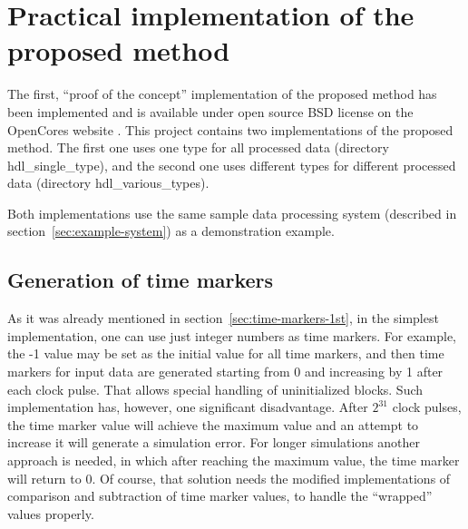 \documentclass[preprint,11pt]{elsarticle}
\newcommand{\wzcite}[1]{ \cite{#1}}
\begin{document}
\section{Practical implementation of the proposed method}
\label{sec:practical-implementation}
The first, ``proof of the concept'' implementation of the proposed method has been implemented and is available under open source BSD license on the OpenCores
website\wzcite{url-opencores-lateq}.
This project contains two implementations of the proposed method.
The first one uses one type for all processed data (directory hdl\_single\_type), and the 
second one uses different types for different processed data (directory 
hdl\_various\_types).

Both implementations use the same sample data processing system (described in section~\ref{sec:example-system}) as a demonstration
example.
\subsection{Generation of time markers}
\label{sec:time-markers-2nd}
As it was already mentioned in section~\ref{sec:time-markers-1st}, in the simplest implementation, 
one can use just integer numbers as time markers.
For example, the -1 value may be set as the initial value for all time markers, and
then time markers for input data are generated starting from 0 and increasing by 1 after each clock pulse.
That allows special handling of uninitialized blocks.
Such implementation has, however, one significant disadvantage. After $2^{31}$ clock pulses,
the time marker value will achieve the maximum value and an attempt to increase it will generate a simulation error.
For longer simulations another approach is needed, in which after reaching the maximum value, the time marker will return to 0. Of course, that solution needs the modified
implementations of comparison and subtraction of time marker values, to handle the ``wrapped'' values properly.
\end{document}
